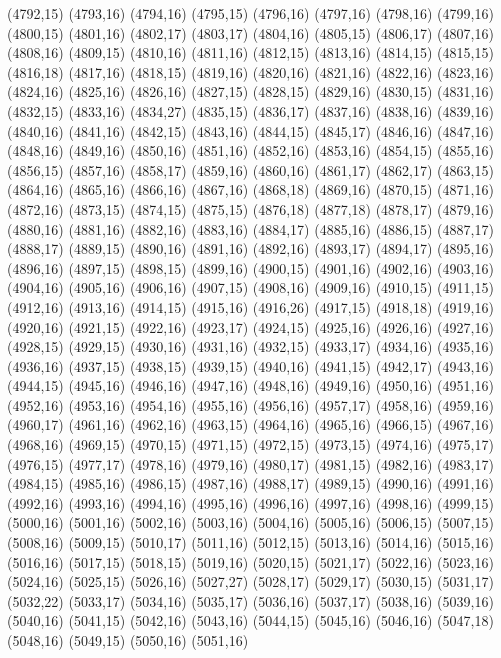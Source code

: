 (4792,15)
(4793,16)
(4794,16)
(4795,15)
(4796,16)
(4797,16)
(4798,16)
(4799,16)
(4800,15)
(4801,16)
(4802,17)
(4803,17)
(4804,16)
(4805,15)
(4806,17)
(4807,16)
(4808,16)
(4809,15)
(4810,16)
(4811,16)
(4812,15)
(4813,16)
(4814,15)
(4815,15)
(4816,18)
(4817,16)
(4818,15)
(4819,16)
(4820,16)
(4821,16)
(4822,16)
(4823,16)
(4824,16)
(4825,16)
(4826,16)
(4827,15)
(4828,15)
(4829,16)
(4830,15)
(4831,16)
(4832,15)
(4833,16)
(4834,27)
(4835,15)
(4836,17)
(4837,16)
(4838,16)
(4839,16)
(4840,16)
(4841,16)
(4842,15)
(4843,16)
(4844,15)
(4845,17)
(4846,16)
(4847,16)
(4848,16)
(4849,16)
(4850,16)
(4851,16)
(4852,16)
(4853,16)
(4854,15)
(4855,16)
(4856,15)
(4857,16)
(4858,17)
(4859,16)
(4860,16)
(4861,17)
(4862,17)
(4863,15)
(4864,16)
(4865,16)
(4866,16)
(4867,16)
(4868,18)
(4869,16)
(4870,15)
(4871,16)
(4872,16)
(4873,15)
(4874,15)
(4875,15)
(4876,18)
(4877,18)
(4878,17)
(4879,16)
(4880,16)
(4881,16)
(4882,16)
(4883,16)
(4884,17)
(4885,16)
(4886,15)
(4887,17)
(4888,17)
(4889,15)
(4890,16)
(4891,16)
(4892,16)
(4893,17)
(4894,17)
(4895,16)
(4896,16)
(4897,15)
(4898,15)
(4899,16)
(4900,15)
(4901,16)
(4902,16)
(4903,16)
(4904,16)
(4905,16)
(4906,16)
(4907,15)
(4908,16)
(4909,16)
(4910,15)
(4911,15)
(4912,16)
(4913,16)
(4914,15)
(4915,16)
(4916,26)
(4917,15)
(4918,18)
(4919,16)
(4920,16)
(4921,15)
(4922,16)
(4923,17)
(4924,15)
(4925,16)
(4926,16)
(4927,16)
(4928,15)
(4929,15)
(4930,16)
(4931,16)
(4932,15)
(4933,17)
(4934,16)
(4935,16)
(4936,16)
(4937,15)
(4938,15)
(4939,15)
(4940,16)
(4941,15)
(4942,17)
(4943,16)
(4944,15)
(4945,16)
(4946,16)
(4947,16)
(4948,16)
(4949,16)
(4950,16)
(4951,16)
(4952,16)
(4953,16)
(4954,16)
(4955,16)
(4956,16)
(4957,17)
(4958,16)
(4959,16)
(4960,17)
(4961,16)
(4962,16)
(4963,15)
(4964,16)
(4965,16)
(4966,15)
(4967,16)
(4968,16)
(4969,15)
(4970,15)
(4971,15)
(4972,15)
(4973,15)
(4974,16)
(4975,17)
(4976,15)
(4977,17)
(4978,16)
(4979,16)
(4980,17)
(4981,15)
(4982,16)
(4983,17)
(4984,15)
(4985,16)
(4986,15)
(4987,16)
(4988,17)
(4989,15)
(4990,16)
(4991,16)
(4992,16)
(4993,16)
(4994,16)
(4995,16)
(4996,16)
(4997,16)
(4998,16)
(4999,15)
(5000,16)
(5001,16)
(5002,16)
(5003,16)
(5004,16)
(5005,16)
(5006,15)
(5007,15)
(5008,16)
(5009,15)
(5010,17)
(5011,16)
(5012,15)
(5013,16)
(5014,16)
(5015,16)
(5016,16)
(5017,15)
(5018,15)
(5019,16)
(5020,15)
(5021,17)
(5022,16)
(5023,16)
(5024,16)
(5025,15)
(5026,16)
(5027,27)
(5028,17)
(5029,17)
(5030,15)
(5031,17)
(5032,22)
(5033,17)
(5034,16)
(5035,17)
(5036,16)
(5037,17)
(5038,16)
(5039,16)
(5040,16)
(5041,15)
(5042,16)
(5043,16)
(5044,15)
(5045,16)
(5046,16)
(5047,18)
(5048,16)
(5049,15)
(5050,16)
(5051,16)
